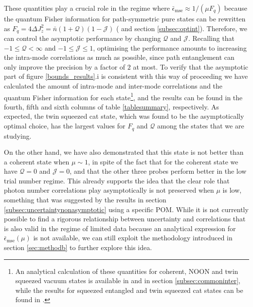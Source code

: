 These quantities play a crucial role in the regime where $\bar{\epsilon}_{\mathrm{mse}} \approx 1 /(\mu F_q)$ because the quantum Fisher information for path-symmetric pure states can be rewritten as $F_q = 4\Delta J_z^2 = \bar{n}(1+\mathcal{Q})(1-\mathcal{J})$ (\cite{sahota2015, knott2016local} and section \ref{subsec:optint}). Therefore, we can control the asymptotic performance by changing $\mathcal{Q}$ and $\mathcal{J}$. Recalling that $-1\leqslant\mathcal{Q}<\infty$ and $-1\leqslant\mathcal{J}\leqslant 1$, optimising the performance amounts to increasing the intra-mode correlations as much as possible, since path entanglement can only improve the precision by a factor of $2$ at most. To verify that the asymptotic part of figure \ref{bounds_results}.i is consistent with this way of proceeding we have calculated the amount of intra-mode and inter-mode correlations and the quantum Fisher information for each state\footnote{An analytical calculation of these quantities for coherent, NOON and twin squeezed vacuum states is available in \cite{sahota2015} and in section \ref{subsec:commoninter}, while the results for squeezed entangled and twin squeezed cat states can be found in \cite{PaulProctor2016}.}, and the results can be found in the fourth, fifth and sixth columns of table \ref{tablesummary}, respectively. As expected, the twin squeezed cat state, which was found to be the asymptotically optimal choice, has the largest values for $F_q$ and $\mathcal{Q}$ among the states that we are studying.

On the other hand, we have also demonstrated that this state is not better than a coherent state when $\mu \sim 1$, in spite of the fact that for the coherent state we have $\mathcal{Q} = 0$ and $\mathcal{J}=0$, and that the other three probes perform better in the low trial number regime. This already supports the idea that the clear role that photon number correlations play asymptotically is not preserved when $\mu$ is low, something that was suggested by the results in section \ref{subsec:uncertaintynonasymptotic} using a specific POM. While it is not currently possible to find a rigorous relationship between uncertainty and correlations that is also valid in the regime of limited data because an analytical expression for $\bar{\epsilon}_{\mathrm{mse}}(\mu)$ is not available, we can still exploit the methodology introduced in section \ref{sec:methodb} to further explore this idea.

